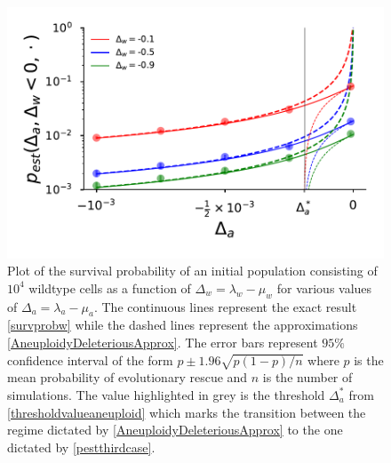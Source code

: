 \documentclass[12pt]{extarticle}
\begin{document}
\begin{figure}[!t]
 \vspace*{1\baselineskip}
\includegraphics[width=1\textwidth]{Figures/P_est_divergence.pdf}
\caption{Plot of the survival probability of an initial population consisting of $10^{4}$ wildtype cells as a function of $\Delta_w=\lambda_w-\mu_w$ for various values of $\Delta_a=\lambda_a-\mu_a$. The continuous lines represent the exact result \eqref{survprobw} while the dashed lines represent the approximations \eqref{AneuploidyDeleteriousApprox}. The error bars represent $95\%$ confidence interval of the form $p\pm1.96\sqrt{p\left(1-p\right)/n}$ where $p$ is the mean probability of evolutionary rescue and $n$ is the number of simulations. The value highlighted in grey is the threshold $\Delta_a^*$ from \eqref{thresholdvalueaneuploid} which marks the transition between the regime dictated by \eqref{AneuploidyDeleteriousApprox} to the one dictated by \eqref{pestthirdcase}. }
\label{P_est}
\end{figure}
\end{document}
